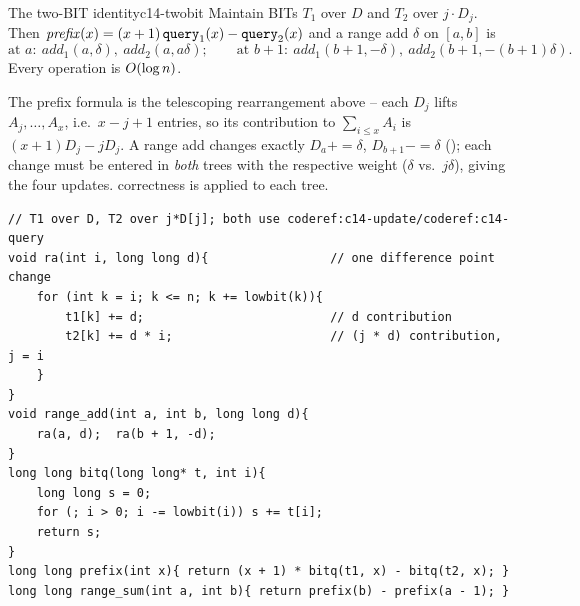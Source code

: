 \begin{theorem}{The two-BIT identity}{c14-twobit}
Maintain BITs \(T_1\) over \(D\) and \(T_2\) over \(j\cdot D_j\).  Then
\(\displaystyle\mathit{prefix}(x)=(x+1)\,\texttt{query}_1(x)-\texttt{query}_2(x)\)
and a range add \(\delta\) on \([a,b]\) is
\[
\text{at }a:\ \mathit{add_1}(a,\delta),\ \mathit{add_2}(a,a\delta);
\qquad
\text{at }b{+}1:\ \mathit{add_1}(b{+}1,-\delta),\ \mathit{add_2}(b{+}1,-(b{+}1)\delta).
\]
Every operation is \(O(\log n)\).
\end{theorem}
\begin{proofbox}
The prefix formula is the telescoping rearrangement above -- each \(D_j\)
lifts \(A_j,\dots,A_x\), i.e.\ \(x-j+1\) entries, so its contribution to
\(\sum_{i\le x}A_i\) is \((x+1)D_j-jD_j\).  A range add changes exactly
\(D_a{+}=\delta\), \(D_{b+1}{-}=\delta\) (); each change
must be entered in \emph{both} trees with the respective weight
(\(\delta\) vs.\ \(j\delta\)), giving the four updates.  
correctness is  applied to each tree.
\end{proofbox}

\begin{lstlisting}[caption={range add + range sum with two BITs (worked example, not a linked problem: CSES has no such task)}, label={lst:c14-twobit}]
// T1 over D, T2 over j*D[j]; both use coderef:c14-update/coderef:c14-query
void ra(int i, long long d){                 // one difference point change
    for (int k = i; k <= n; k += lowbit(k)){
        t1[k] += d;                          // d contribution
        t2[k] += d * i;                      // (j * d) contribution, j = i
    }
}
void range_add(int a, int b, long long d){
    ra(a, d);  ra(b + 1, -d);
}
long long bitq(long long* t, int i){
    long long s = 0;
    for (; i > 0; i -= lowbit(i)) s += t[i];
    return s;
}
long long prefix(int x){ return (x + 1) * bitq(t1, x) - bitq(t2, x); }
long long range_sum(int a, int b){ return prefix(b) - prefix(a - 1); }
\end{lstlisting}

